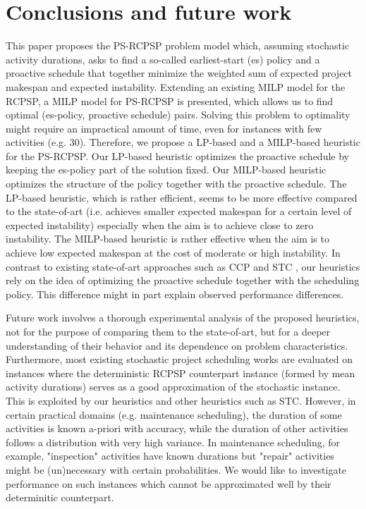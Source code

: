 \section{Conclusions and future work}
\label{sec-conclusion}

This paper proposes the PS-RCPSP problem model which,
assuming stochastic activity durations,
asks to find a so-called earliest-start (es) policy and
a proactive schedule that together minimize the weighted 
sum of expected project makespan and expected instability.
Extending an existing MILP model for the RCPSP,
a MILP model for PS-RCPSP is presented, which allows us to 
find optimal (es-policy, proactive schedule) pairs.
Solving this problem to optimality might require an impractical amount of time,
even for instances with few activities (e.g. 30).
Therefore, we propose a LP-based and a MILP-based heuristic for the PS-RCPSP.
Our LP-based heuristic optimizes the proactive schedule by keeping the es-policy part of the  solution fixed.
Our MILP-based heuristic optimizes the structure of the policy together with the proactive schedule.
The LP-based heuristic, which is rather efficient, seems to be more effective compared to the state-of-art
(i.e. achieves smaller expected makespan for a certain level of expected instability) especially
when the aim is to achieve close to zero instability.
The MILP-based heuristic is rather effective when the aim is to
achieve low expected makespan at the cost of moderate or high instability.
In contrast to existing state-of-art approaches such as
CCP \cite{lamas2015} and STC \cite{van2008},
our heuristics rely on the idea of optimizing 
the proactive schedule together with the scheduling policy.
This difference might in part explain observed performance differences.

Future work involves a thorough experimental analysis of the proposed heuristics,
not for the purpose of comparing them to the state-of-art,
but for a deeper understanding of their behavior and its
dependence on problem characteristics.
Furthermore, most existing stochastic project scheduling works are evaluated on instances where
the deterministic RCPSP counterpart instance 
(formed by mean activity durations) serves as a good approximation of the stochastic instance.
This is exploited by our heuristics and other heuristics such as STC.
However, in certain practical domains (e.g. maintenance scheduling),
the duration of some activities is known a-priori with accuracy,
while the duration of other activities follows a distribution with very high variance.
In maintenance scheduling, for example, "inspection" activities have known durations
but "repair" activities might be (un)necessary with certain probabilities. 
We would like to investigate performance on such instances 
which cannot be approximated well by their determinitic counterpart.